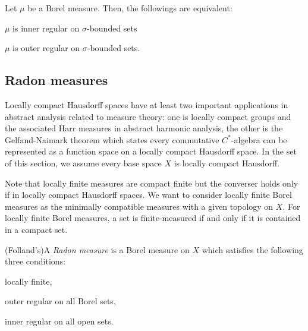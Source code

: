 \documentclass{../exp}
\begin{document}
\begin{thm}
Let $\mu$ be a Borel measure.
Then, the followings are equivalent:
\begin{cond}
\item$\mu$ is inner regular on $\sigma$-bounded sets
\item $\mu$ is outer regular on $\sigma$-bounded sets.
\end{cond}
\end{thm}



\subsection{Radon measures}

Locally compact Hausdorff spaces have at least two important applications in abstract analysis related to measure theory: one is locally compact groups and the associated Harr measures in abstract harmonic analysis, the other is the Gelfand-Naimark theorem which states every commutative $C^*$-algebra can be represented as a function space on a locally compact Hausdorff space.
In the set of this section, we assume every base space $X$ is locally compact Hausdorff.

Note that locally finite measures are compact finite but the converser holds only if in locally compact Hausdorff spaces.
We want to consider locally finite Borel measures as the minimally compatible measures with a given topology on $X$.
For locally finite Borel measures, a set is finite-measured if and only if it is contained in a compact set.
\begin{defn}
(Folland's)A \emph{Radon measure} is a Borel measure on $X$ which satisfies the following three conditions:
\begin{cond}
\item locally finite,
\item outer regular on all Borel sets,
\item inner regular on all open sets.
\end{cond}
\end{defn}
\end{document}
